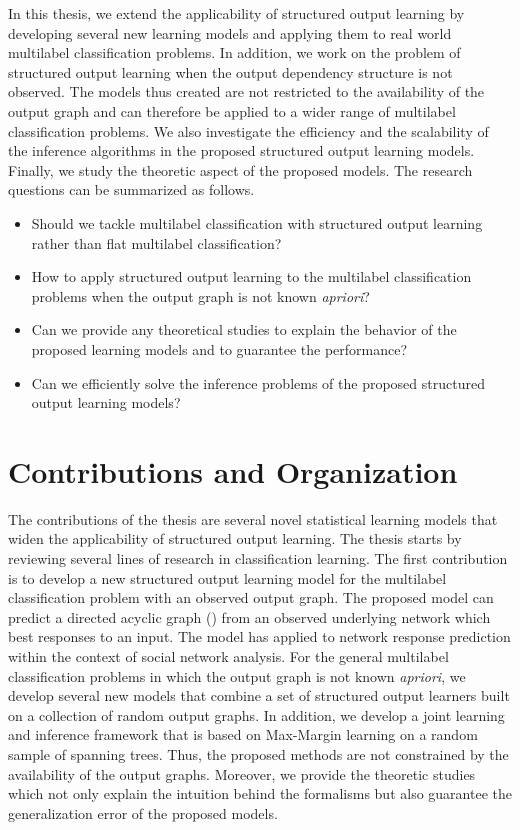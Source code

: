 In this thesis, we extend the applicability of structured output learning by developing several new learning models and applying them to real world multilabel classification problems.
In addition, we work on the problem of structured output learning when the output dependency structure is not observed.
The models thus created are not restricted to the availability of the output graph and can therefore be applied to a wider range of multilabel classification problems.
We also investigate the efficiency and the scalability of the inference algorithms in the proposed structured output learning models.
Finally, we study the theoretic aspect of the proposed models.
The research questions can be summarized as follows.
\begin{itemize}
\item Should we tackle multilabel classification with structured output learning rather than flat multilabel classification?
\item How to apply structured output learning to the multilabel classification problems when the output graph is not known \textit{apriori}?
\item Can we provide any theoretical studies to explain the behavior of the proposed learning models and to guarantee the performance?
\item Can we efficiently solve the inference problems of the proposed structured output learning models?
\end{itemize}



%
%
\section{Contributions and Organization}

The contributions of the thesis are several novel statistical learning models that widen the applicability of structured output learning.
The thesis starts by reviewing several lines of research in classification learning.
The first contribution is to develop a new structured output learning model for the multilabel classification problem with an observed output graph.
The proposed model can predict a directed acyclic graph (\daggraph) from an observed underlying network which best responses to an input.
The model has applied to network response prediction within the context of social network analysis.
For the general multilabel classification problems in which the output graph is not known \textit{apriori}, we develop several new models that combine a set of structured output learners built on a collection of random output graphs.
In addition, we develop a joint learning and inference framework that is based on Max-Margin learning on a random sample of spanning trees.
Thus, the proposed methods are not constrained by the availability of the output graphs.
Moreover, we provide the theoretic studies which not only explain the intuition behind the formalisms but also guarantee the generalization error of the proposed models.

